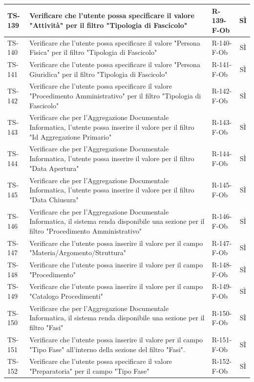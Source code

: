 \documentclass[a4paper,12pt]{article}
\begin{document}
\begin{longtable}{|p{1.5cm}|p{8.3cm}|p{2.4cm}|c|}
\hline
TS-139 & Verificare che l'utente possa specificare il valore "Attività" per il filtro "Tipologia di Fascicolo" & R-139-F-Ob & SÌ \\
\hline
TS-140 & Verificare che l'utente possa specificare il valore "Persona Fisica" per il filtro "Tipologia di Fascicolo" & R-140-F-Ob & SÌ \\
\hline
TS-141 & Verificare che l'utente possa specificare il valore "Persona Giuridica" per il filtro "Tipologia di Fascicolo" & R-141-F-Ob & SÌ \\
\hline
TS-142 & Verificare che l'utente possa specificare il valore "Procedimento Amministrativo" per il filtro "Tipologia di Fascicolo" & R-142-F-Ob & SÌ \\
\hline
TS-143 & Verificare che per l'Aggregazione Documentale Informatica, l'utente possa inserire il valore per il filtro "Id Aggregazione Primario" & R-143-F-Ob & SÌ \\
\hline
TS-144 & Verificare che per l'Aggregazione Documentale Informatica, l'utente possa inserire il valore per il filtro "Data Apertura" & R-144-F-Ob & SÌ \\
\hline
TS-145 & Verificare che per l'Aggregazione Documentale Informatica, l'utente possa inserire il valore per il filtro "Data Chiusura" & R-145-F-Ob & SÌ \\
\hline
TS-146 & Verificare che per l'Aggregazione Documentale Informatica, il sistema renda disponibile una sezione per il filtro "Procedimento Amministrativo" & R-146-F-Ob & SÌ \\
\hline
TS-147 & Verificare che l'utente possa inserire il valore per il campo "Materia/Argomento/Struttura" & R-147-F-Ob & SÌ \\
\hline
TS-148 & Verificare che l'utente possa inserire il valore per il campo "Procedimento" & R-148-F-Ob & SÌ \\
\hline
TS-149 & Verificare che l'utente possa inserire il valore per il campo "Catalogo Procedimenti" & R-149-F-Ob & SÌ \\
\hline
TS-150 & Verificare che per l'Aggregazione Documentale Informatica, il sistema renda disponibile una sezione per il filtro "Fasi" & R-150-F-Ob & SÌ \\
\hline
TS-151 & Verificare che l'utente possa inserire il valore per il campo "Tipo Fase" all'interno della sezione del filtro "Fasi". & R-151-F-Ob & SÌ \\
\hline
TS-152 & Verificare che l'utente possa specificare il valore "Preparatoria" per il campo "Tipo Fase" & R-152-F-Ob & SÌ \\

\end{longtable}
\end{document}
